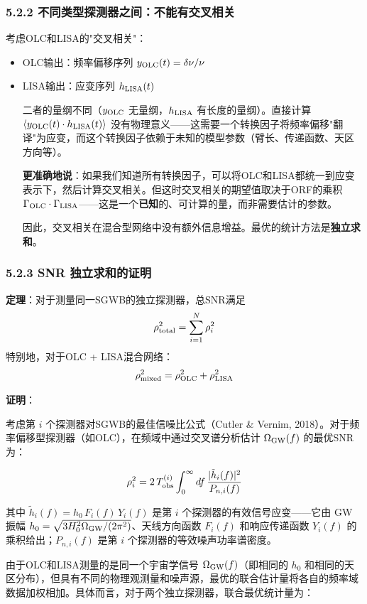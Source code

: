 \documentclass[12pt,a4paper]{article}
\begin{document}
\subsubsection{5.2.2 不同类型探测器之间：不能有交叉相关}


考虑OLC和LISA的"交叉相关"：
\begin{itemize}
  \item OLC输出：频率偏移序列 $y_{\rm OLC}(t) = \delta\nu/\nu$
  \item LISA输出：应变序列 $h_{\rm LISA}(t)$

二者的量纲不同（$y_{\rm OLC}$ 无量纲，$h_{\rm LISA}$ 有长度的量纲）。直接计算 $\langle y_{\rm OLC}(t) \cdot h_{\rm LISA}(t)\rangle$ 没有物理意义——这需要一个转换因子将频率偏移"翻译"为应变，而这个转换因子依赖于未知的模型参数（臂长、传递函数、天区方向等）。

\textbf{更准确地说}：如果我们知道所有转换因子，可以将OLC和LISA都统一到应变表示下，然后计算交叉相关。但这时交叉相关的期望值取决于ORF的乘积 $\Gamma_{\rm OLC} \cdot \Gamma_{\rm LISA}$——这是一个\textbf{已知}的、可计算的量，而非需要估计的参数。

因此，交叉相关在混合型网络中没有额外信息增益。最优的统计方法是\textbf{独立求和}。

\end{itemize}
\subsubsection{5.2.3 SNR 独立求和的证明}


\textbf{定理}：对于测量同一SGWB的独立探测器，总SNR满足
$$\rho_{\rm total}^2 = \sum_{i=1}^N \rho_i^2$$
特别地，对于OLC + LISA混合网络：
$$\rho_{\rm mixed}^2 = \rho_{\rm OLC}^2 + \rho_{\rm LISA}^2$$

\textbf{证明}：

考虑第 $i$ 个探测器对SGWB的最佳信噪比公式（Cutler \& Vernim, 2018\cite{ref12}）。对于频率偏移型探测器（如OLC），在频域中通过交叉谱分析估计 $\Omega_{\rm GW}(f)$ 的最优SNR为：

$$\rho_i^2 = 2\, T_{\rm obs}^{(i)} \int_0^\infty df\, \frac{|\tilde{h}_i(f)|^2}{P_{n,i}(f)}$$

其中 $\tilde{h}_i(f) = h_0\, F_i(f)\, Y_i(f)$ 是第 $i$ 个探测器的有效信号应变——它由 GW 振幅 $h_0 = \sqrt{3H_0^2 \Omega_{\rm GW}/(2\pi^2)}$、天线方向函数 $F_i(f)$ 和响应传递函数 $Y_i(f)$ 的乘积给出；$P_{n,i}(f)$ 是第 $i$ 个探测器的等效噪声功率谱密度。

由于OLC和LISA测量的是同一个宇宙学信号 $\Omega_{\rm GW}(f)$（即相同的 $h_0$ 和相同的天区分布），但具有不同的物理观测量和噪声源，最优的联合估计量将各自的频率域数据加权相加。具体而言，对于两个独立探测器，联合最优统计量为：
\end{document}
